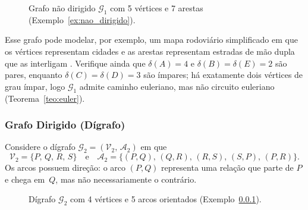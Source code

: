 \documentclass[
  12pt,
  oneside,
  a4paper,
  english,
  brazilian
  ]{abntex2}
\theoremstyle{definition}
\def\sffamily{}%
\def\bfseries{}%
\begin{document}
\begin{figure}[htb]
  \centering
  \caption{Grafo não dirigido $\mathcal{G}_1$ com 5 vértices e 7 arestas
           (Exemplo~\ref{ex:nao_dirigido}).}
  \label{fig:grafo_nao_dirigido}
\end{figure}

Esse grafo pode modelar, por exemplo, um mapa rodoviário simplificado em que os
vértices representam cidades e as arestas representam estradas de mão dupla que
as interligam \cite{jurkiewicz2007}. Verifique ainda que $\delta(A) = 4$ e
$\delta(B) = \delta(E) = 2$ são pares, enquanto $\delta(C) = \delta(D) = 3$
são ímpares; há exatamente dois vértices de grau ímpar, logo $\mathcal{G}_1$
admite caminho euleriano, mas não circuito euleriano
(Teorema~\ref{teo:euler}).

\subsubsection{Grafo Dirigido (Dígrafo)}


\label{ex:digrafo}
Considere o dígrafo $\mathcal{G}_2 = (\mathcal{V}_2,\, \mathcal{A}_2)$ em que
\[
  \mathcal{V}_2 = \{P,\, Q,\, R,\, S\}
  \quad \text{e} \quad
  \mathcal{A}_2 = \{(P,Q),\, (Q,R),\, (R,S),\, (S,P),\, (P,R)\}.
\]
Os arcos possuem direção: o arco $(P, Q)$ representa uma relação que parte de
$P$ e chega em~$Q$, mas não necessariamente o contrário.


\begin{figure}[htb]
  \centering
  \caption{Dígrafo $\mathcal{G}_2$ com 4 vértices e 5 arcos orientados
           (Exemplo~\ref{ex:digrafo}).}
  \label{fig:digrafo_ex2}
\end{figure}
\end{document}
